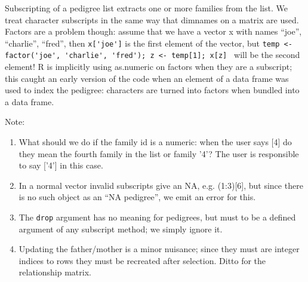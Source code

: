 \documentclass{article}
\begin{document}
Subscripting of a pedigree list extracts one or more families from the
list.  We treat character subscripts in the same way that dimnames on
a matrix are used.  Factors are a problem though: assume that we
have a vector x with names ``joe'', ``charlie'', ``fred'', then
\Verb!x['joe']! is the first element of the vector, but
\Verb!temp <- factor('joe', 'charlie', 'fred'); z <- temp[1]; x[z] ! will
be the second element! 
R is implicitly using as.numeric on factors when they are a subscript;
this caught an early version of the code when an element of a data
frame was used to index the pedigree: characters are turned into factors
when bundled into a data frame.

Note:
\begin{enumerate}
  \item What should we do if the family id is a numeric: when the user
    says [4] do they mean the fourth family in the list or family '4'?
    The user is responsible to say ['4'] in this case.
  \item  In a normal vector invalid subscripts give an NA, e.g. (1:3)[6], but
    since there is no such object as an ``NA pedigree'', we emit an error
    for this.
  \item The \Verb!drop! argument has no meaning for pedigrees, but must to be
    a defined argument of any subscript method; we simply ignore it.
  \item Updating the father/mother is a minor nuisance;
    since they must are integer indices to rows they must be
    recreated after selection.  Ditto for the relationship matrix.  
\end{enumerate}
\end{document}
